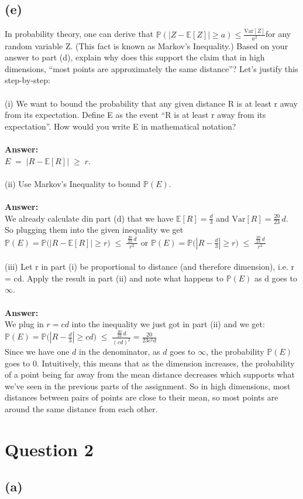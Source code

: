 \documentclass{article}
\begin{document}
\subsection*{(e)}
In probability theory, one can derive that
$\mathbb{P}(|Z - \mathbb{E}[Z]| \geq a) \leq \frac{\mathrm{Var}[Z]}{a^2}
$for any random variable Z. (This fact is known as Markov’s Inequality.) Based on your answer to part (d), explain why does this support the claim that in high dimensions, “most points are approximately the same distance”? Let’s justify this step-by-step: \\\\
(i) We want to bound the probability that any given distance R is at least r away from its expectation. Define E as the event “R is at least r away from its expectation”. How would you write E in mathematical notation? \\\\
\color{answer}
\textbf{Answer:} \\
$ E \;=\;\bigl\lvert R - \mathbb{E}[R]\bigr\rvert \;\ge\; r. $ \\\\
\color{black}
(ii) Use Markov’s Inequality to bound $\mathbb{P}(E)$. \\\\
\color{answer}
\textbf{Answer:} \\
We already calculate din part (d) that we have
$\mathbb{E}[R]=\tfrac d3$ and $\mathrm{Var}[R]=\tfrac{20}{23}\,d$. So plugging them into the given inequality we get $\mathbb{P}(E)
=\mathbb{P}\bigl(|R-\mathbb{E}[R]|\ge r\bigr)
\;\le\; \frac{\,\tfrac{20}{23}\,d\,}{r^{2}}$ \space or \space $\mathbb{P}(E)=\mathbb{P}\bigl(|R-\frac{d}{3}|\ge r\bigr) \;\le\; \frac{\,\tfrac{20}{23}\,d\,}{r^{2}}$\\\\
\color{black}
(iii) Let r in part (i) be proportional to distance (and therefore dimension), i.e. r = cd. Apply the result in part (ii) and note what happens to $\mathbb{P}(E)$ as d goes to $\infty$. \\\\
\color{answer}
\textbf{Answer:} \\
We plug in $r=cd$ into the inequality we just got in part (ii) and we get: \\
$\mathbb{P}(E)=\mathbb{P}\bigl(|R-\frac{d}{3}|\ge cd\bigr) \;\le\; \frac{\,\tfrac{20}{23}\,d\,}{(cd)^{2}}=\frac{20}{23c^{2}d}$ \\
Since we have one $d$ in the denominator, as $d$ goes to $\infty$, the probability $\mathbb{P}(E)$ goes to $0$. Intuitively, this means that as the dimension increases, the probability of a point being far away from the mean distance decreases which supports what we've seen in the previous parts of the assignment. So in high dimensions, most distances between pairs of points are close to their mean, so most points are around the same distance from each other.\\
\color{black}
\section*{Question 2}
\subsection*{(a)}
\end{document}
